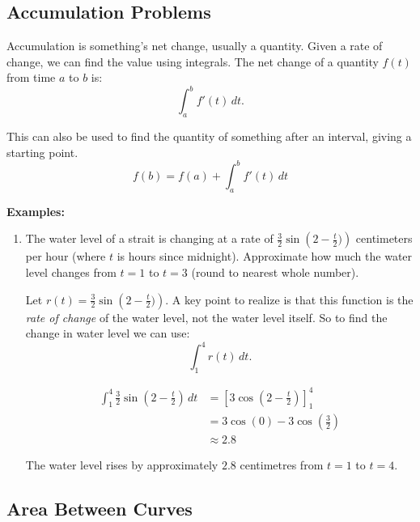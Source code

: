 \documentclass[12pt]{article}
\begin{document}
        \subsection{Accumulation Problems}
            Accumulation is something's net change, usually a quantity. Given a rate of change, we can find the value using integrals. The net change of a quantity $f(t)$ from time $a$ to $b$ is:
            \[ \int_{a}^{b} f'(t) \, dt. \]

            This can also be used to find the quantity of something after an interval, giving a starting point.
            \[ f(b) = f(a) + \int_{a}^{b} f'(t) \, dt \]

            \noindent \textbf{Examples:}
            \begin{enumerate}
                \item The water level of a strait is changing at a rate of $\frac{3}{2} \sin \left(2- \frac{t}{2}) \right)$ centimeters per hour (where $t$ is hours since midnight). Approximate how much the water level changes from $t=1$ to $t=3$ (round to nearest whole number).

                Let $r(t) = \frac{3}{2} \sin \left(2- \frac{t}{2}) \right)$. A key point to realize is that this function is the \textit{rate of change} of the water level, not the water level itself. So to find the change in water level we can use:
                \[ \int_{1}^{4} r(t) \, dt. \]

                \begin{align*}
                    \int_{1}^{4} \frac{3}{2} \sin \left(2- \frac{t}{2} \right) \, dt &= \left[ 3 \cos \left(2 - \frac{t}{2} \right) \right]_1^4 \\[6pt]
                    &= 3 \cos(0) - 3\cos \left( \frac{3}{2} \right) \\[6pt]
                    &\approx 2.8
                \end{align*}

                The water level rises by approximately $2.8$ centimetres from $t=1$ to $t=4$.
            \end{enumerate} %

        \subsection{Area Between Curves}
\end{document}
